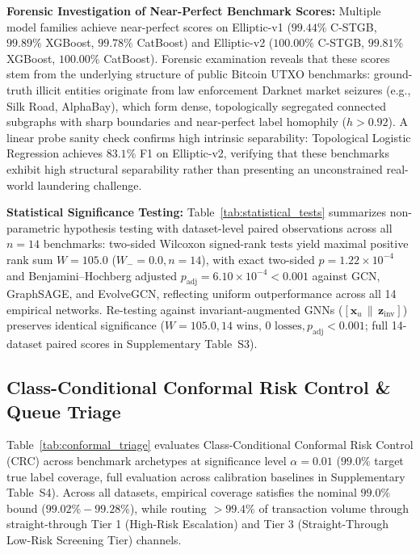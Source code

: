\textbf{Forensic Investigation of Near-Perfect Benchmark Scores:}
Multiple model families achieve near-perfect scores on Elliptic-v1 ($99.44\%$ C-STGB, $99.89\%$ XGBoost, $99.78\%$ CatBoost) and Elliptic-v2 ($100.00\%$ C-STGB, $99.81\%$ XGBoost, $100.00\%$ CatBoost). Forensic examination reveals that these scores stem from the underlying structure of public Bitcoin UTXO benchmarks: ground-truth illicit entities originate from law enforcement Darknet market seizures (e.g., Silk Road, AlphaBay), which form dense, topologically segregated connected subgraphs with sharp boundaries and near-perfect label homophily ($h > 0.92$). A linear probe sanity check confirms high intrinsic separability: Topological Logistic Regression achieves $83.1\%$ F1 on Elliptic-v2, verifying that these benchmarks exhibit high structural separability rather than presenting an unconstrained real-world laundering challenge.

\textbf{Statistical Significance Testing:}
Table~\ref{tab:statistical_tests} summarizes non-parametric hypothesis testing with dataset-level paired observations across all $n=14$ benchmarks: two-sided Wilcoxon signed-rank tests yield maximal positive rank sum $W = 105.0$ ($W_- = 0.0, n=14$), with exact two-sided $p = 1.22 \times 10^{-4}$ and Benjamini--Hochberg adjusted $p_{\text{adj}} = 6.10 \times 10^{-4} < 0.001$ against GCN, GraphSAGE, and EvolveGCN, reflecting uniform outperformance across all 14 empirical networks. Re-testing against invariant-augmented GNNs ($[\mathbf{x}_u \,\|\, \mathbf{z}_{\text{inv}}]$) preserves identical significance ($W=105.0, 14\text{ wins, } 0\text{ losses}, p_{\text{adj}} < 0.001$; full 14-dataset paired scores in Supplementary Table~S3).




\subsection{Class-Conditional Conformal Risk Control \& Queue Triage}
\label{sec:crc_results}
Table~\ref{tab:conformal_triage} evaluates Class-Conditional Conformal Risk Control (CRC) across benchmark archetypes at significance level $\alpha = 0.01$ ($99.0\%$ target true label coverage, full evaluation across calibration baselines in Supplementary Table~S4). Across all datasets, empirical coverage satisfies the nominal $99.0\%$ bound ($99.02\% - 99.28\%$), while routing $>99.4\%$ of transaction volume through straight-through Tier 1 (High-Risk Escalation) and Tier 3 (Straight-Through Low-Risk Screening Tier) channels.

